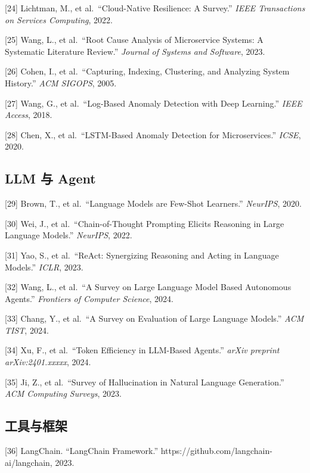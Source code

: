 {[}24{]} Lichtman, M., et al.~``Cloud-Native Resilience: A Survey.''
\emph{IEEE Transactions on Services Computing}, 2022.

{[}25{]} Wang, L., et al.~``Root Cause Analysis of Microservice Systems:
A Systematic Literature Review.'' \emph{Journal of Systems and
Software}, 2023.

{[}26{]} Cohen, I., et al.~``Capturing, Indexing, Clustering, and
Analyzing System History.'' \emph{ACM SIGOPS}, 2005.

{[}27{]} Wang, G., et al.~``Log-Based Anomaly Detection with Deep
Learning.'' \emph{IEEE Access}, 2018.

{[}28{]} Chen, X., et al.~``LSTM-Based Anomaly Detection for
Microservices.'' \emph{ICSE}, 2020.

\hypertarget{llm-ux4e0e-agent}{%
\subsection{LLM 与 Agent}\label{llm-ux4e0e-agent}}

{[}29{]} Brown, T., et al.~``Language Models are Few-Shot Learners.''
\emph{NeurIPS}, 2020.

{[}30{]} Wei, J., et al.~``Chain-of-Thought Prompting Elicits Reasoning
in Large Language Models.'' \emph{NeurIPS}, 2022.

{[}31{]} Yao, S., et al.~``ReAct: Synergizing Reasoning and Acting in
Language Models.'' \emph{ICLR}, 2023.

{[}32{]} Wang, L., et al.~``A Survey on Large Language Model Based
Autonomous Agents.'' \emph{Frontiers of Computer Science}, 2024.

{[}33{]} Chang, Y., et al.~``A Survey on Evaluation of Large Language
Models.'' \emph{ACM TIST}, 2024.

{[}34{]} Xu, F., et al.~``Token Efficiency in LLM-Based Agents.''
\emph{arXiv preprint arXiv:2401.xxxxx}, 2024.

{[}35{]} Ji, Z., et al.~``Survey of Hallucination in Natural Language
Generation.'' \emph{ACM Computing Surveys}, 2023.

\hypertarget{ux5de5ux5177ux4e0eux6846ux67b6}{%
\subsection{工具与框架}\label{ux5de5ux5177ux4e0eux6846ux67b6}}

{[}36{]} LangChain. ``LangChain Framework.''
https://github.com/langchain-ai/langchain, 2023.

